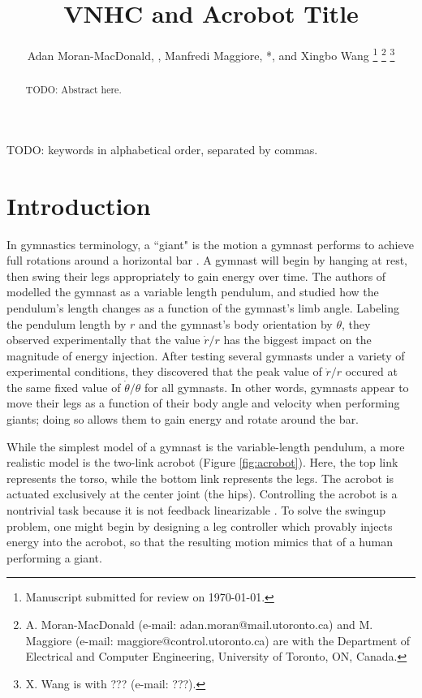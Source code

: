 \documentclass[journal,twoside,web]{ieeecolor}
\newcommand*{\Title}{VNHC and Acrobot Title}
\begin{document}
\title{\Title}
\author{Adan Moran-MacDonald, , Manfredi Maggiore,
*, and Xingbo Wang
\thanks{Manuscript submitted for review on \today.}
\thanks{A. Moran-MacDonald (e-mail: adan.moran@mail.utoronto.ca) and
M. Maggiore (e-mail: maggiore@control.utoronto.ca) are with the Department of
Electrical and Computer Engineering, University of Toronto, ON, Canada.}
\thanks{X. Wang is with ??? (e-mail: ???).}
} %

\maketitle

\begin{abstract}
TODO: Abstract here.
\end{abstract}

\begin{IEEEkeywords}
TODO: keywords in alphabetical order, separated by commas.
\end{IEEEkeywords}

\section{Introduction}\label{sec:introduction}

In gymnastics terminology, a ``giant" is the motion a gymnast performs to
achieve full rotations around a horizontal bar \cite{usagym_giant}. 
A gymnast will begin by hanging at rest, then swing their legs
appropriately to gain energy over time.
The authors of \cite{pendulum_length_giant_gymnastics} modelled the gymnast as a
variable length pendulum, and studied how the pendulum's length changes as a
function of the gymnast's limb angle.
Labeling the pendulum length by \(r\) and the gymnast's body orientation
by \(\theta\), they observed experimentally that the value \(\dot{r}/r\) has
the biggest impact on the magnitude of energy injection. 
After testing several gymnasts under a variety of experimental conditions, 
they discovered that the peak value of \(\dot{r}/r\) occured at the same fixed
value of \(\dot{\theta}/\theta\) for all gymnasts.
In other words, gymnasts appear to move their legs as a function of their body
angle and velocity when performing giants; 
doing so allows them to gain energy and rotate around the bar.

While the simplest model of a gymnast is the variable-length pendulum, a
more realistic model is the two-link acrobot (Figure \ref{fig:acrobot}).
Here, the top link represents the torso, while the bottom link represents
the legs. 
The acrobot is actuated exclusively at the center joint (the hips).
Controlling the acrobot is a nontrivial task because it is not feedback
linearizable \cite{nonlinear_controllers_nonintegrable_acrobot}. 
To solve the swingup problem, one might begin by designing a leg controller
which provably injects energy into the acrobot, so that the resulting motion
mimics that of a human performing a giant.
\end{document}
